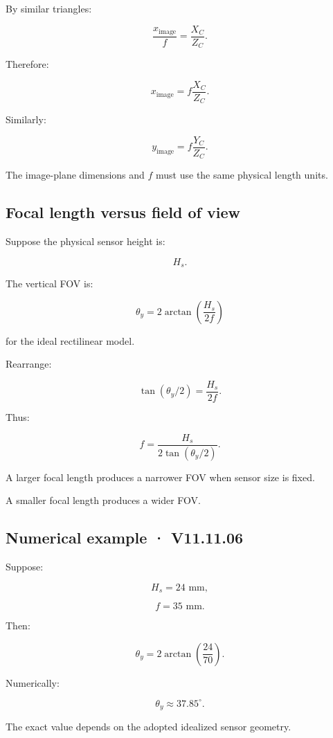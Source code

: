 By similar triangles:

\[
 \frac{x_{\mathrm{image}}}{f} = \frac{X_C}{Z_C}.
\]

Therefore:

\[
 \boxed{ x_{\mathrm{image}}= f\frac{X_C}{Z_C} }.
\]

Similarly:

\[
 \boxed{ y_{\mathrm{image}}= f\frac{Y_C}{Z_C} }.
\]

The image-plane dimensions and \(f\) must use the same physical length units.

\subsection{Focal length versus field of view}\label{02-foundations-ii-ch034-focal-length-versus-field-of-view}

Suppose the physical sensor height is:

\[
 H_s.
\]

The vertical FOV is:

\[
 \boxed{ \theta_y= 2\arctan\left(\frac{H_s}{2f}\right) }
\]

for the ideal rectilinear model.

Rearrange:

\[
 \tan(\theta_y/2)=\frac{H_s}{2f}.
\]

Thus:

\[
 \boxed{ f=\frac{H_s}{2\tan(\theta_y/2)} }.
\]

A larger focal length produces a narrower FOV when sensor size is fixed.

A smaller focal length produces a wider FOV.

\subsection{Numerical example · V11.11.06}\label{02-foundations-ii-ch034-numerical-example-v11.11.06}

Suppose:

\[
 H_s=24\text{ mm},
\]

\[
 f=35\text{ mm}.
\]

Then:

\[
 \theta_y= 2\arctan\left(\frac{24}{70}\right).
\]

Numerically:

\[
 \boxed{ \theta_y\approx37.85^\circ }.
\]

The exact value depends on the adopted idealized sensor geometry.

